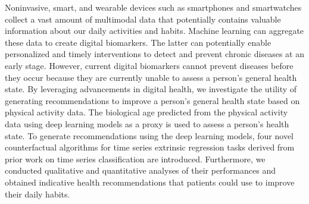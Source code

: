 Noninvasive, smart, and wearable devices such as smartphones and smartwatches collect a vast amount of multimodal data that potentially contains valuable information about our daily activities and habits.
% 
Machine learning can aggregate these data to create digital biomarkers. The latter can potentially enable personalized and timely interventions to detect and prevent chronic diseases at an early stage. However, current digital biomarkers cannot prevent diseases before they occur because they are currently unable to assess a person's general health state. 
% 
By leveraging advancements in digital health, we investigate the utility of generating recommendations to improve a person's general health state based on physical activity data. The biological age predicted from the physical activity data using deep learning models as a proxy is used to assess a person's health state.
% 
To generate recommendations using the deep learning models, four novel counterfactual algorithms for time series extrinsic regression tasks derived from prior work on time series classification are introduced. Furthermore, we conducted qualitative and quantitative analyses of their performances and obtained indicative health recommendations that patients could use to improve their daily habits.